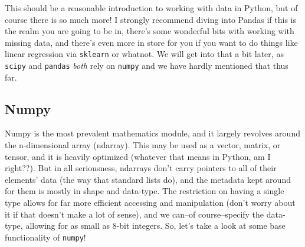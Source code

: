 \documentclass[12pt, twoside, reqno]{book}
\begin{document}
This should be a reasonable introduction to working with data in Python, but of course there is so much more! I strongly recommend diving into Pandas if this is the realm you are going to be in, there's some wonderful bits with working with missing data, and there's even more in store for you if you want to do things like linear regression via \texttt{sklearn} or whatnot. We will get into that a bit later, as \texttt{scipy} and \texttt{pandas} \textit{both} rely on \texttt{numpy} and we have hardly mentioned that thus far.

\subsection{Numpy}

Numpy is the most prevalent mathematics module, and it largely revolves around the n-dimensional array (ndarray). This may be used as a vector, matrix, or tensor, and it is heavily optimized (whatever that means in Python, am I right??). But in all seriousness, ndarrays don't carry pointers to all of their elements' data (the way that standard lists do), and the metadata kept around for them is mostly in shape and data-type. The restriction on having a single type allows for far more efficient accessing and manipulation (don't worry about it if that doesn't make a lot of sense), and we can--of course--specify the data-type, allowing for as small as 8-bit integers. So, let's take a look at some base functionality of \texttt{numpy}!
\end{document}
